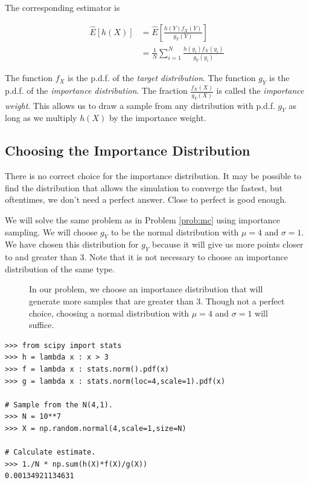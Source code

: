 The corresponding estimator is

\begin{equation}\label{eq:imp_estimator}
\begin{split}
\widehat{E}[h(X)] & = \widehat{E}\left [ \frac{h(Y)f_X(Y)}{g_Y(Y)}\right ] \\
& = \frac{1}{N}\sum_{i = 1}^{N}\frac{h(y_i)f_X(y_i)}{g_Y(y_i)}
\end{split}
\end{equation}

The function $f_X$ is the p.d.f. of the \emph{target distribution}. The function $g_Y$ is the p.d.f. of the \emph{importance distribution}. The fraction $\frac{f_X(X)}{g_Y(X)}$ is called the \emph{importance weight}. This allows us to draw a sample from any distribution with p.d.f. $g_Y$ as long as we multiply $h(X)$ by the importance weight.

\subsection*{Choosing the Importance Distribution} %

There is no correct choice for the importance distribution. It may be possible to find the distribution that allows the simulation to converge the fastest, but oftentimes, we don't need a perfect answer. Close to perfect is good enough.

We will solve the same problem as in Problem \ref{prob:mc} using importance sampling. We will choose $g_Y$ to be the normal distribution with $\mu = 4$ and $\sigma = 1$.
We have chosen this distribution for $g_Y$ because it will give us more points closer to and greater than 3. Note that it is not necessary to choose an importance distribution of the same type.

\begin{figure}[H]
\caption{In our problem, we choose an importance distribution that will generate more samples that are greater than 3. Though not a perfect choice, choosing a normal distribution with $\mu = 4$ and $\sigma = 1$ will suffice.}
\label{fig:importance}
\end{figure}

\begin{lstlisting}
>>> from scipy import stats
>>> h = lambda x : x > 3
>>> f = lambda x : stats.norm().pdf(x)
>>> g = lambda x : stats.norm(loc=4,scale=1).pdf(x)

# Sample from the N(4,1).
>>> N = 10**7
>>> X = np.random.normal(4,scale=1,size=N)

# Calculate estimate.
>>> 1./N * np.sum(h(X)*f(X)/g(X))
0.00134921134631
\end{lstlisting}

